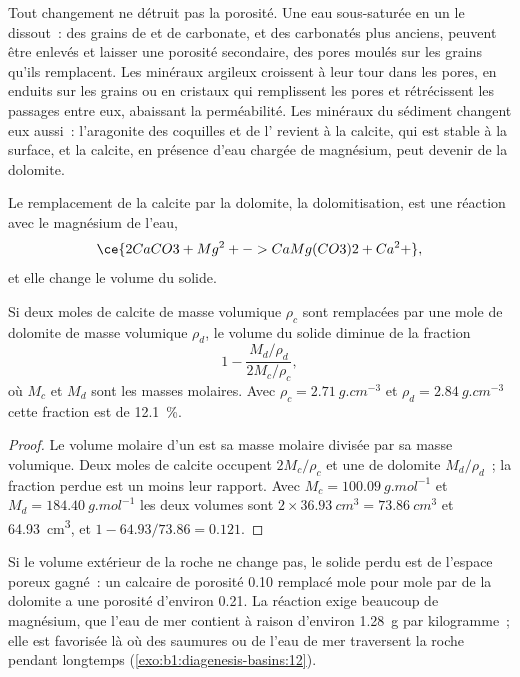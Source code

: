 Tout changement ne détruit pas la porosité. Une eau sous-saturée en un  le dissout~:
des grains de  et de carbonate, et des  carbonatés plus anciens, peuvent être
enlevés et laisser une porosité secondaire, des pores moulés sur les grains qu'ils
remplacent. Les minéraux argileux croissent à leur tour dans les pores, en enduits sur les grains ou en
cristaux qui remplissent les pores et rétrécissent les passages entre eux, abaissant la
perméabilité. Les minéraux du sédiment changent eux aussi~:
l'aragonite des coquilles et de l' revient à la calcite, qui est
stable à la surface, et la calcite, en présence d'eau chargée de magnésium,
peut devenir de la dolomite.

Le remplacement de la calcite par la dolomite, la dolomitisation, est une réaction avec
le magnésium de l'eau,
\[
  \ce{2 CaCO3 + Mg^2+ -> CaMg(CO3)2 + Ca^2+},
\]
et elle change le volume du solide.

\begin{proposition}\label{prop:b1:diagenesis-basins:dolomite}
Si deux moles de calcite de masse volumique $\rho_c$ sont remplacées par une mole de dolomite
de masse volumique $\rho_d$, le volume du solide diminue de la fraction
\[
  1 - \frac{M_d/\rho_d}{2M_c/\rho_c},
\]
où $M_c$ et $M_d$ sont les masses molaires. Avec $\rho_c = \qty{2.71}{g.cm^{-3}}$
et $\rho_d = \qty{2.84}{g.cm^{-3}}$ cette fraction est de \qty{12.1}{\percent}.
\end{proposition}

\begin{proof}
Le volume molaire d'un  est sa masse molaire divisée par sa masse volumique. Deux
moles de calcite occupent $2M_c/\rho_c$ et une de dolomite $M_d/\rho_d$~; la
fraction perdue est un moins leur rapport. Avec $M_c = \qty{100.09}{g.mol^{-1}}$
et $M_d = \qty{184.40}{g.mol^{-1}}$ les deux volumes sont
$2\times\qty{36.93}{cm^3} = \qty{73.86}{cm^3}$ et \qty{64.93}{cm^3}, et
$1 - 64.93/73.86 = \num{0.121}$.
\end{proof}

Si le volume extérieur de la roche ne change pas, le solide perdu est de l'espace poreux
gagné~: un calcaire de porosité \num{0.10} remplacé mole pour mole par de la dolomite a
une porosité d'environ \num{0.21}. La réaction exige beaucoup de magnésium,
que l'eau de mer contient à raison d'environ \qty{1.28}{g} par kilogramme~; elle est favorisée là où
des saumures ou de l'eau de mer traversent la roche pendant longtemps
(\cref{exo:b1:diagenesis-basins:12}).

